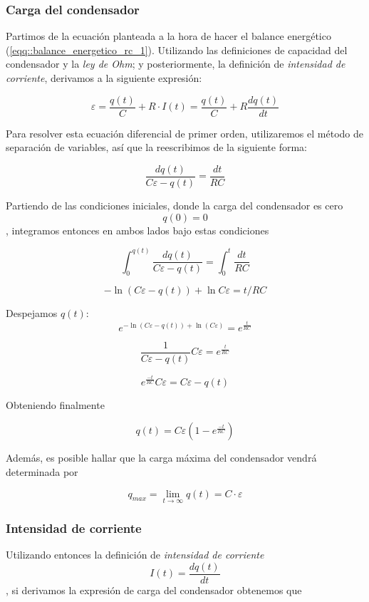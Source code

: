 \documentclass[../main.tex]{subfiles}
\begin{document}
\subsubsection{Carga del condensador}
\label{part::carga_condensador_1}
Partimos de la ecuación planteada a la hora de hacer el balance energético (\ref{eqq::balance_energetico_rc_1}). Utilizando las definiciones de capacidad del condensador y la \textit{ley de Ohm}; y posteriormente, la definición de \textit{intensidad de corriente}, derivamos a la siguiente expresión:

$$\varepsilon = \frac{q(t)}{C} + R\cdot I(t) = \frac{q(t)}{C} + R \frac{d q(t)}{d t}$$

Para resolver esta ecuación diferencial de primer orden, utilizaremos el método de separación de variables, así que la reescribimos de la siguiente forma:

$$\frac{d q(t)}{C\varepsilon - q(t)} = \frac{d t}{RC}$$

Partiendo de las condiciones iniciales, donde la carga del condensador es cero 
$$q(0) = 0$$, integramos entonces en ambos lados bajo estas condiciones

$$\int_{0}^{q(t)} \frac{d q(t)}{C\varepsilon - q(t)}  =  \int_{0}^{t} \frac{d t}{RC} $$


$$ -\ln{\left( C\varepsilon - q(t)\right)} + \ln C\varepsilon = t/{RC}$$

Despejamos $q(t)$:
{\large
$$ e^{-\ln{\left( C\varepsilon - q(t)\right)} + \ln{\left( C\varepsilon \right)}} = e^{\frac{t}{RC}}$$ }

$$\frac{1}{C\varepsilon - q(t)}C\varepsilon = e^{\frac{t}{RC}}$$

$$e^{\frac{-t}{RC}} C  \varepsilon = C\varepsilon - q(t)$$

Obteniendo finalmente

\begin{equation}
    q(t) = C\varepsilon \left( 1 - e^{\frac{-t}{RC}} \right)
    \label{eqq:q(t)_carga_rc}
\end{equation}

Además, es posible hallar que la carga máxima del condensador vendrá determinada por 

$$q_{max} = \lim_{t \to \infty} q(t) = C \cdot \varepsilon$$

\subsubsection{Intensidad de corriente}
\label{part::carga_condensador_2}
Utilizando entonces la definición de \textit{intensidad de corriente}
$$I(t) = \frac{d q(t)}{ d t}$$, si derivamos la expresión de carga del condensador obtenemos que
\end{document}
